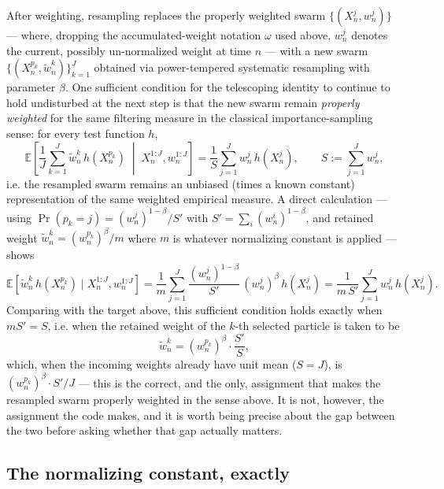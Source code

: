 \documentclass[11pt]{article}
\newcommand{\E}{\mathbb{E}}
\begin{document}
After weighting, resampling replaces the properly weighted swarm
$\{(X_n^j, w_n^j)\}$ — where, dropping the accumulated-weight notation
$\omega$ used above, $w_n^j$ denotes the current, possibly un-normalized
weight at time $n$ — with a new swarm $\{(X_n^{p_k}, \tilde w_{n}^k)\}_{k=1}^J$
obtained via power-tempered systematic resampling with parameter $\beta$. One
sufficient condition for the telescoping identity to continue to hold
undisturbed at the next step is that the new swarm remain \emph{properly
weighted} for the same filtering measure in the classical importance-sampling
sense: for every test function $h$,
\[
\E\left[\frac1J \sum_{k=1}^J \tilde w_n^k\, h(X_n^{p_k}) \;\middle|\; X_n^{1:J}, w_n^{1:J}\right]
= \frac{1}{S}\sum_{j=1}^J w_n^j\, h(X_n^j), \qquad S := \sum_{j=1}^J w_n^j,
\]
i.e. the resampled swarm remains an unbiased (times a known constant)
representation of the same weighted empirical measure. A direct calculation —
using $\Pr(p_k = j) = (w_n^j)^{1-\beta}/S'$ with $S' = \sum_i (w_n^i)^{1-\beta}$,
and retained weight $\tilde w_n^k = (w_n^{p_k})^\beta / m$ where $m$ is
whatever normalizing constant is applied — shows
\[
\E\left[\tilde w_n^k\, h(X_n^{p_k}) \mid X_n^{1:J}, w_n^{1:J}\right]
= \frac{1}{m}\sum_{j=1}^J \frac{(w_n^j)^{1-\beta}}{S'}\,(w_n^j)^\beta\, h(X_n^j)
= \frac{1}{m\,S'} \sum_{j=1}^J w_n^j\, h(X_n^j).
\]
Comparing with the target above, this sufficient condition holds exactly when
$m S' = S$, i.e. when the retained weight of the $k$-th selected particle is
taken to be
\[
\tilde w_n^k = (w_n^{p_k})^\beta \cdot \frac{S'}{S},
\]
which, when the incoming weights already have unit mean ($S=J$), is
$(w_n^{p_k})^\beta\cdot S'/J$ — this is the correct, and the only, assignment
that makes the resampled swarm properly weighted in the sense above. It is
not, however, the assignment the code makes, and it is worth being precise
about the gap between the two before asking whether that gap actually
matters.

\subsection{The normalizing constant, exactly}
\label{sec:removed-factor}
\end{document}
